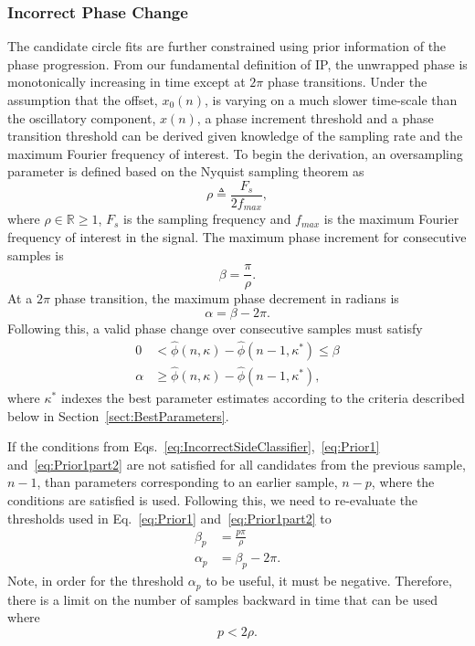 \documentclass[journal,11pt,a4paper,onecolumn,draftcls]{IEEEtran}
\begin{document}
\subsubsection{Incorrect Phase Change}
The candidate circle fits are further constrained using prior information of the phase progression. From our fundamental definition of IP, the unwrapped phase is monotonically increasing in time except at $2\pi$ phase transitions. Under the assumption that the offset, $x_0(n)$, is varying on a much slower time-scale than the oscillatory component, $x(n)$, a phase increment threshold and a phase transition threshold can be derived given knowledge of the sampling rate and the maximum Fourier frequency of interest. To begin the derivation, an oversampling parameter is defined based on the Nyquist sampling theorem as
\begin{equation}
	\rho\triangleq\frac{F_s}{2f_{max}},
\end{equation}
where $\rho \in \mathbb{R} \ge 1$, $F_s$ is the sampling frequency and $f_{max}$ is the maximum Fourier frequency of interest in the signal. The maximum phase increment for consecutive samples is 
\begin{equation}
	\beta = \frac{\pi}{\rho}.
\end{equation}
At a $2\pi$ phase transition, the maximum phase decrement in radians is
\begin{equation}
	\alpha=\beta-2\pi.
\end{equation}
Following this, a valid phase change over consecutive samples must satisfy
\begin{align}\label{eq:Prior1}
0 &< \hat{\phi} \left( n,\kappa \right) - \hat{\phi} \left( n-1,\kappa^* \right) \le \beta \\
\alpha &\ge \hat{\phi} \left( n,\kappa \right) - \hat{\phi} \left( n-1,\kappa^* \right), \label{eq:Prior1part2}
\end{align}
where $\kappa^*$ indexes the best parameter estimates according to the criteria described below in Section~\ref{sect:BestParameters}. 

If the conditions from Eqs.~\ref{eq:IncorrectSideClassifier},~\ref{eq:Prior1} and~\ref{eq:Prior1part2} are not satisfied for all candidates from the previous sample, $n-1$, than parameters corresponding to an earlier sample, $n-p$, where the conditions are satisfied is used. Following this, we need to re-evaluate the thresholds used in Eq.~\ref{eq:Prior1} and~\ref{eq:Prior1part2} to
\begin{align}
	\beta_p &= \frac{p\pi}{\rho} \\
	\alpha_p &=\beta_p-2\pi.
\end{align}
Note, in order for the threshold $\alpha_p$ to be useful, it must be negative. Therefore, there is a limit on the number of samples backward in time that can be used where
\begin{equation}
	p < 2\rho.
\end{equation}
\end{document}
